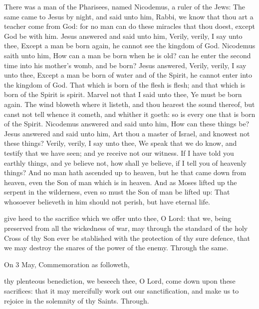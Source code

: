 
 There was a man of the Pharisees, named Nicodemus, a ruler of the Jews: The same came to Jesus by night, and said unto him, Rabbi, we know that thou art a teacher come from God: for no man can do these miracles that thou doest, except God be with him. Jesus answered and said unto him, Verily, verily, I say unto thee, Except a man be born again, he cannot see the kingdom of God. Nicodemus saith unto him, How can a man be born when he is old? can he enter the second time into his mother's womb, and be born? Jesus answered, Verily, verily, I say unto thee, Except a man be born of water and of the Spirit, he cannot enter into the kingdom of God. That which is born of the flesh is flesh; and that which is born of the Spirit is spirit. Marvel not that I said unto thee, Ye must be born again. The wind bloweth where it listeth, and thou hearest the sound thereof, but canst not tell whence it cometh, and whither it goeth: so is every one that is born of the Spirit. Nicodemus answered and said unto him, How can these things be? Jesus answered and said unto him, Art thou a master of Israel, and knowest not these things? Verily, verily, I say unto thee, We speak that we do know, and testify that we have seen; and ye receive not our witness. If I have told you earthly things, and ye believe not, how shall ye believe, if I tell you of heavenly things? And no man hath ascended up to heaven, but he that came down from heaven, even the Son of man which is in heaven. And as Moses lifted up the serpent in the wilderness, even so must the Son of man be lifted up: That whosoever believeth in him should not perish, but have eternal life.


\secret
{} give heed to the sacrifice which we offer unto thee, O Lord: that we, being preserved from all the wickedness of war, may through the standard of the holy Cross of thy Son ever be stablished with the protection of thy sure defence, that we may destroy the snares of the power of the enemy. Through the same.
\begin{rubric}
	 On 3 May, Commemoration  as followeth,
\end{rubric}
 thy plenteous benediction, we beseech thee, O Lord, come down upon these sacrifices: that it may mercifully work out our sanctification, and make us to rejoice in the solemnity of thy Saints. Through.

